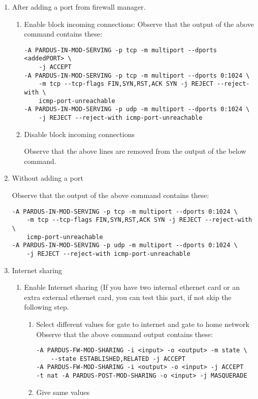 \documentclass[a4paper,10pt]{article}
\begin{document}
\begin{enumerate}
\begin{enumerate}
     \item After adding a port from firewall manager.
        \begin{enumerate}
        \item Enable block incoming connections:
            	Observe that the output of the above command contains these: 
\begin{verbatim}
-A PARDUS-IN-MOD-SERVING -p tcp -m multiport --dports <addedPORT> \
    -j ACCEPT
-A PARDUS-IN-MOD-SERVING -p tcp -m multiport --dports 0:1024 \
    -m tcp --tcp-flags FIN,SYN,RST,ACK SYN -j REJECT --reject-with \
    icmp-port-unreachable
-A PARDUS-IN-MOD-SERVING -p udp -m multiport --dports 0:1024 \
    -j REJECT --reject-with icmp-port-unreachable
\end{verbatim} 
        \item Disable block incoming connections

              Observe that the above lines are removed from the output of the below command.
        \end{enumerate}
    \item Without adding a port

        Observe that the output of the above command contains these:

\begin{verbatim}
-A PARDUS-IN-MOD-SERVING -p tcp -m multiport --dports 0:1024 \
    -m tcp --tcp-flags FIN,SYN,RST,ACK SYN -j REJECT --reject-with \
    icmp-port-unreachable
-A PARDUS-IN-MOD-SERVING -p udp -m multiport --dports 0:1024 \
    -j REJECT --reject-with icmp-port-unreachable
\end{verbatim} 


\item Internet sharing
    \begin{enumerate}
    \item Enable Internet sharing
    	(If you have two internal ethernet card or an extra external ethernet card, you can test this part, if not skip the following step.
        \begin{enumerate}

        \item Select different values for gate to internet and gate to home network
            	Observe that the above command output contains these:
\begin{verbatim}
-A PARDUS-FW-MOD-SHARING -i <input> -o <output> -m state \
    --state ESTABLISHED,RELATED -j ACCEPT
-A PARDUS-FW-MOD-SHARING -i <output> -o <input> -j ACCEPT
-t nat -A PARDUS-POST-MOD-SHARING -o <input> -j MASQUERADE
\end{verbatim} 
        \item Give same values


\end{enumerate}
\end{enumerate}
\end{enumerate}
\end{enumerate}
\end{document}
